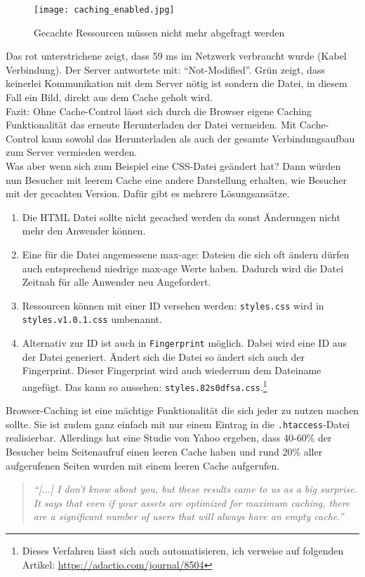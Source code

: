 		  \begin{figure}[htbp]
		  	\begin{center}
		  		\texttt{[image: caching\_enabled.jpg]}
		  		\caption{Gecachte Ressourcen müssen nicht mehr abgefragt werden}
		  		\label{fig:caching_enabled}
		  	\end{center}
		  \end{figure}
		  
		  Das rot unterstrichene zeigt, dass 59 ms im Netzwerk verbraucht wurde (Kabel Verbindung). Der Server antwortete mit: "`Not-Modified"'. Grün zeigt, dass keinerlei Kommunikation mit dem Server nötig ist sondern die Datei, in diesem Fall ein Bild, direkt aus dem Cache geholt wird.\\
		  Fazit: Ohne Cache-Control lässt sich durch die Browser eigene Caching Funktionalität das erneute Herunterladen der Datei vermeiden. Mit Cache-Control kann sowohl das Herunterladen als auch der gesamte Verbindungsaufbau zum Server vermieden werden.\\
		 
		  Was aber wenn sich zum Beispiel eine CSS-Datei geändert hat? Dann würden nun Besucher mit leerem Cache eine andere Darstellung erhalten, wie Besucher mit der gecachten Version. Dafür gibt es mehrere Lösungsansätze.

		  \begin{enumerate}
		  	\item Die HTML Datei sollte nicht gecached werden da sonst Änderungen nicht mehr den Anwender können.
		  	\item Eine für die Datei angemessene max-age: Dateien die sich oft ändern dürfen auch entsprechend niedrige max-age Werte haben. Dadurch wird die Datei Zeitnah für alle Anwender neu Angefordert.
		  	\item Ressourcen können mit einer ID versehen werden: \texttt{styles.css} wird in \texttt{styles.v1.0.1.css} umbenannt.
		  	\item Alternativ zur ID ist auch in \texttt{Fingerprint} möglich. Dabei wird eine ID aus der Datei generiert. Ändert sich die Datei so ändert sich auch der Fingerprint. Dieser Fingerprint wird auch wiederrum dem Dateiname angefügt. Das kann so aussehen: \texttt{styles.82s0dfsa.css}.\footnote{Dieses Verfahren lässt sich auch automatisieren, ich verweise auf folgenden Artikel: \url{https://adactio.com/journal/8504}}
		  \end{enumerate}

		  Browser-Caching ist eine mächtige Funktionalität die sich jeder zu nutzen machen sollte. Sie ist zudem ganz einfach mit nur einem Eintrag in die \texttt{.htaccess}-Datei realisierbar. Allerdings hat eine Studie von Yahoo ergeben, dass 40-60\% der Besucher beim Seitenaufruf einen leeren Cache haben und rund 20\% aller aufgerufenen Seiten wurden mit einem leeren Cache aufgerufen.
			\begin{quote}
				\textit{"`[...] I don't know about you, but these results came to us as a big surprise. It says that even if your assets are optimized for maximum caching, there are a significant number of users that will always have an empty cache."'\autocite{yahoo07}}
			\end{quote}

